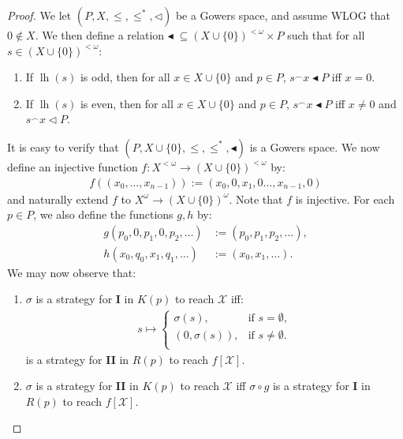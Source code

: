 \documentclass[11pt,reqno]{amsart}
\theoremstyle{plain}
\numberwithin{equation}{section}
\theoremstyle{definition}
\newcommand{\func}{\operatorname}
\newcommand{\cal}{\mathcal}
\newcommand{\X}{\cal{X}}
\newcommand{\lh}{\func{lh}}
\newcommand{\blhd}{\blacktriangleleft}
\begin{document}
\begin{proof}
    We let $(P,X,\leq,\leq^*,\lhd)$ be a Gowers space, and assume WLOG that $0 \notin X$. We then define a relation $\blhd \; \subseteq (X \cup \{0\})^{<\omega} \times P$ such that for all $s \in (X \cup \{0\})^{<\omega}$:
    \begin{enumerate}
        \item If $\lh(s)$ is odd, then for all $x \in X \cup \{0\}$ and $p \in P$, $s^\frown x \blhd P$ iff $x = 0$.
    
        \item If $\lh(s)$ is even, then for all $x \in X \cup \{0\}$ and $p \in P$, $s^\frown x \blhd P$ iff $x \neq 0$ and $s^\frown x \lhd P$.
    \end{enumerate}
    
    It is easy to verify that $(P,X \cup \{0\},\leq,\leq^*,\blhd)$ is a Gowers space. We now define an injective function $f : X^{<\omega} \to (X \cup \{0\})^{<\omega}$ by:
    \begin{align*}
        f((x_0,\dots,x_{n-1})) := (x_0,0,x_1,0\dots,x_{n-1},0)
    \end{align*}
    and naturally extend $f$ to $X^\omega \to (X \cup \{0\})^\omega$. Note that $f$ is injective. For each $p \in P$, we also define the functions $g,h$ by:
    \begin{align*}
        g(p_0,0,p_1,0,p_2,\dots) &:= (p_0,p_1,p_2,\dots), \\
        h(x_0,q_0,x_1,q_1,\dots) &:= (x_0,x_1,\dots).
    \end{align*}
    We may now observe that:
    \begin{enumerate}
        \item $\sigma$ is a strategy for \textbf{I} in $K(p)$ to reach $\X$ iff:
        \begin{align*}
            s \mapsto 
            \begin{cases}
                \sigma(s), &\text{if $s = \emptyset$}, \\
                (0,\sigma(s)), &\text{if $s \neq \emptyset$}. \\
            \end{cases}
        \end{align*}
        is a strategy for \textbf{II} in $R(p)$ to reach $f[\X]$.

        \item $\sigma$ is a strategy for \textbf{II} in $K(p)$ to reach $\X$ iff $\sigma \circ g$ is a strategy for \textbf{I} in $R(p)$ to reach $f[\X]$.


\end{enumerate}
\end{proof}
\end{document}
